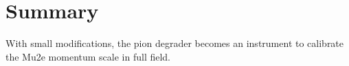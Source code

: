 \documentclass[12pt]{article}
\begin{document}


\section {Summary}

With small modifications, the pion degrader becomes an instrument to calibrate the Mu2e
momentum scale in full field.


%
\newpage



% 

\end{document}
